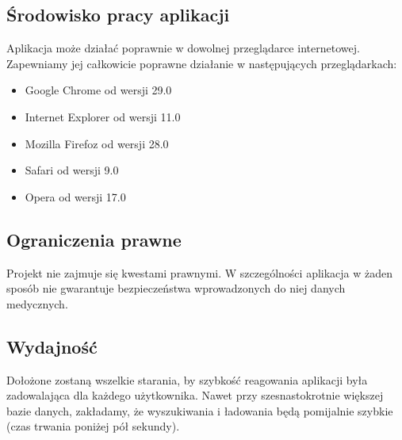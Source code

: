 \documentclass[10pt, a4paper]{article}
\begin{document}
\subsection{Środowisko pracy aplikacji}
Aplikacja może działać poprawnie w dowolnej przeglądarce internetowej. Zapewniamy jej całkowicie poprawne działanie w następujących przeglądarkach:
\begin{itemize}
\item Google Chrome od wersji 29.0
\item Internet Explorer od wersji 11.0
\item Mozilla Firefoz od wersji 28.0
\item Safari od wersji 9.0
\item Opera od wersji 17.0
\end{itemize}
\subsection{Ograniczenia prawne}
Projekt nie zajmuje się kwestami prawnymi. W szczególności aplikacja w żaden sposób nie gwarantuje bezpieczeństwa wprowadzonych do niej danych medycznych.
\subsection{Wydajność}
Dołożone zostaną wszelkie starania, by szybkość reagowania aplikacji była zadowalająca dla każdego użytkownika. Nawet przy szesnastokrotnie większej bazie danych, zakładamy, że wyszukiwania i ładowania będą pomijalnie szybkie (czas trwania poniżej pół sekundy).
\end{document}
